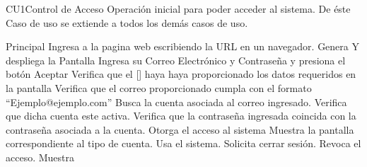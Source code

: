  \begin{UseCase}{CU1}{Control de Acceso}{
		Operación inicial para poder acceder al sistema. De éste Caso de uso se extiende a todos los demás casos de uso.
	}
	\end{UseCase}
	\begin{UCtrayectoria}{Principal}
		\UCpaso[\UCactor] Ingresa a la pagina web escribiendo la URL en un navegador.
		\UCpaso Genera Y despliega la Pantalla 
		\UCpaso [\UCactor] Ingresa su Correo Electrónico y Contraseña y presiona el botón Aceptar
		\UCpaso Verifica que el [\UCactor] haya haya proporcionado los datos requeridos en la pantalla 
		\UCpaso Verifica que el correo proporcionado cumpla con el formato ``Ejemplo@ejemplo.com'' 
		\UCpaso Busca la cuenta asociada al correo ingresado. 
		\UCpaso Verifica que dicha cuenta este activa. 
		\UCpaso Verifica que la contraseña ingresada coincida con la contraseña asociada a la cuenta.
		\UCpaso Otorga el acceso al sistema
		\UCpaso Muestra la pantalla correspondiente al tipo de cuenta.		
		\UCpaso [\UCactor] Usa el sistema.
		\UCpaso [\UCactor] Solicita cerrar sesión.
		\UCpaso Revoca el acceso.
		\UCpaso Muestra 		
	\end{UCtrayectoria}

